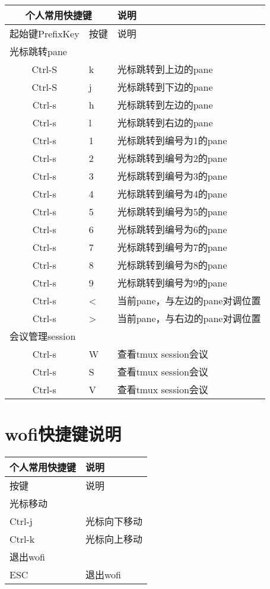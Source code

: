 \documentclass[11pt]{article}
\begin{document}
\begin{left}
  \begin{tabular}{|c|l|l|}
    \hline    
    \multicolumn{2}{|c|}{\textbf{个人常用快捷键}} & \textbf{说明} \\   
    \hline
    起始键PrefixKey & 按键 & 说明 \\
    \hline \multicolumn{3}{|l|}{光标跳转pane} \\ \hline    
    Ctrl-S & k & 光标跳转到上边的pane \\
    Ctrl-S & j & 光标跳转到下边的pane \\
    Ctrl-s & h & 光标跳转到左边的pane \\
    Ctrl-s & l & 光标跳转到右边的pane \\
    Ctrl-s & 1 & 光标跳转到编号为1的pane \\
    Ctrl-s & 2 & 光标跳转到编号为2的pane \\
    Ctrl-s & 3 & 光标跳转到编号为3的pane \\
    Ctrl-s & 4 & 光标跳转到编号为4的pane \\
    Ctrl-s & 5 & 光标跳转到编号为5的pane \\
    Ctrl-s & 6 & 光标跳转到编号为6的pane \\
    Ctrl-s & 7 & 光标跳转到编号为7的pane \\
    Ctrl-s & 8 & 光标跳转到编号为8的pane \\
    Ctrl-s & 9 & 光标跳转到编号为9的pane \\
    Ctrl-s & < & 当前pane，与左边的pane对调位置 \\
    Ctrl-s & > & 当前pane，与右边的pane对调位置 \\    
    \hline \multicolumn{3}{|l|}{会议管理session} \\ \hline
    Ctrl-s & W & 查看tmux session会议 \\
    Ctrl-s & S & 查看tmux session会议 \\
    Ctrl-s & V & 查看tmux session会议 \\        
    \hline
  \end{tabular}  
\end{left}
\newpage{}

\section{wofi快捷键说明}
\begin{left}
  \begin{tabular}{|l|l|}
    \hline
    \multicolumn{1}{|c|}{\textbf{个人常用快捷键}} & \textbf{说明} \\   
    \hline
    按键 & 说明 \\
    \hline \multicolumn{2}{|l|}{光标移动} \\ \hline
    Ctrl-j & 光标向下移动 \\
    Ctrl-k & 光标向上移动 \\
    \hline \multicolumn{2}{|l|}{退出wofi} \\ \hline    
    ESC & 退出wofi \\    
    \hline
  \end{tabular}  
\end{left}
\newpage{}
\end{document}
